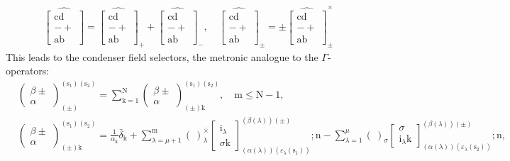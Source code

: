 \documentclass[12pt]{article}
\begin{document}
\begin{itemize}
\begin{equation}
\begin{aligned}
    & \widehat{\left[ \begin{matrix} \mathrm{cd} \\ - + \\ \mathrm{ab} \end{matrix} \right]} = \widehat{\left[ \begin{matrix} \mathrm{cd} \\ - + \\ \mathrm{ab} \end{matrix} \right]}_+ + \widehat{\left[ \begin{matrix} \mathrm{cd} \\ - + \\ \mathrm{ab} \end{matrix} \right]}_-, \quad \widehat{\left[ \begin{matrix} \mathrm{cd} \\ - + \\ \mathrm{ab} \end{matrix} \right]}_\pm = \pm \widehat{\left[ \begin{matrix} \mathrm{cd} \\ - + \\ \mathrm{ab} \end{matrix} \right]}_\pm^\times
    \end{aligned} \tag{94}
    \end{equation}
    This leads to the condenser field selectors, the metronic analogue to the \( \Gamma \)-operators:
    \begin{equation}
    \begin{aligned}
    & \left( \begin{matrix} \beta \pm \\ \alpha \end{matrix} \right)^{(\mathrm{s_1})(\mathrm{s_2})}_{(\pm)} = \sum_{\mathrm{k}=1}^\mathrm{N} \left( \begin{matrix} \beta \pm \\ \alpha \end{matrix} \right)^{(\mathrm{s_1})(\mathrm{s_2})}_{(\pm)\mathrm{k}}, \quad \mathrm{m} \le \mathrm{N}-1, \\
    & \left( \begin{matrix} \beta \pm \\ \alpha \end{matrix} \right)^{(\mathrm{s_1})(\mathrm{s_2})}_{(\pm)\mathrm{k}} = \frac{1}{\alpha_\mathrm{k}} \bar{\delta}_\mathrm{k} + \sum_{\lambda=\mu+1}^\mathrm{m} (\ )^{\bar{\times}}_\lambda \left[ \begin{matrix} \mathrm{i}_\lambda \\ \sigma \mathrm{k} \end{matrix} \right]^{(\beta(\lambda))(\pm)}_{(\alpha(\lambda))(\varepsilon_\lambda(\mathrm{s_1}))} ; \mathrm{n} - \sum_{\lambda=1}^\mu (\ )_\sigma \left[ \begin{matrix} \sigma \\ \mathrm{i}_\lambda \mathrm{k} \end{matrix} \right]^{(\beta(\lambda))(\pm)}_{(\alpha(\lambda))(\varepsilon_\lambda(\mathrm{s_2}))} ; \mathrm{n}, \\

\end{aligned}
\end{equation}
\end{itemize}
\end{document}
